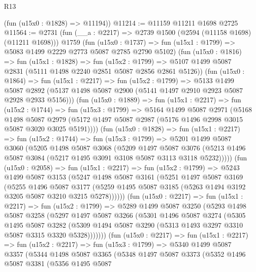 \begin{lexlean}{R13}
\begin{coremodule}
      (fun (u15x0 : @1828) => @11194))
@11214 := @11159 @11211 @1698 @2725
@11564 := @2731
    (fun (__a : @2217) => @2739 @1500 (@2594 (@11158 @1698) (@11211 @1698)))
    @1759
    (fun (u15x0 : @1737) => fun (u15x1 : @1799) => @5083 @1499 @2229 @2773 @5087 @2785 @2790 @5102)
    (fun (u15x0 : @1816) =>
    fun (u15x1 : @1828) =>
    fun (u15x2 : @1799) =>
    @5107 @1499 @5087 @2831 (@5111 @1498 @2240 @2851 @5087 @2856 @2861 @5126))
    (fun (u15x0 : @1864) =>
    fun (u15x1 : @2217) =>
    fun (u15x2 : @1799) =>
    @5133
      @1499
      @5087
      @2892
      (@5137 @1498 @5087 @2900 (@5141 @1497 @2910 @2923 @5087 @2928 @2933 @5156)))
    (fun (u15x0 : @1889) =>
    fun (u15x1 : @2217) =>
    fun (u15x2 : @1744) =>
    fun (u15x3 : @1799) =>
    @5164
      @1499
      @5087
      @2971
      (@5168
        @1498
        @5087
        @2979
        (@5172 @1497 @5087 @2987 (@5176 @1496 @2998 @3015 @5087 @3020 @3025 @5191))))
    (fun (u15x0 : @1828) =>
    fun (u15x1 : @2217) =>
    fun (u15x2 : @1744) =>
    fun (u15x3 : @1799) =>
    @5201
      @1499
      @5087
      @3060
      (@5205
        @1498
        @5087
        @3068
        (@5209
          @1497
          @5087
          @3076
          (@5213 @1496 @5087 @3084 (@5217 @1495 @3091 @3108 @5087 @3113 @3118 @5232)))))
    (fun (u15x0 : @2058) =>
    fun (u15x1 : @2217) =>
    fun (u15x2 : @1799) =>
    @5243
      @1499
      @5087
      @3153
      (@5247
        @1498
        @5087
        @3161
        (@5251
          @1497
          @5087
          @3169
          (@5255
            @1496
            @5087
            @3177
            (@5259 @1495 @5087 @3185 (@5263 @1494 @3192 @3205 @5087 @3210 @3215 @5278))))))
    (fun (u15x0 : @2217) =>
    fun (u15x1 : @2217) =>
    fun (u15x2 : @1799) =>
    @5289
      @1499
      @5087
      @3250
      (@5293
        @1498
        @5087
        @3258
        (@5297
          @1497
          @5087
          @3266
          (@5301
            @1496
            @5087
            @3274
            (@5305
              @1495
              @5087
              @3282
              (@5309 @1494 @5087 @3290 (@5313 @1493 @3297 @3310 @5087 @3315 @3320 @5328)))))))
    (fun (u15x0 : @2217) =>
    fun (u15x1 : @2217) =>
    fun (u15x2 : @2217) =>
    fun (u15x3 : @1799) =>
    @5340
      @1499
      @5087
      @3357
      (@5344
        @1498
        @5087
        @3365
        (@5348
          @1497
          @5087
          @3373
          (@5352
            @1496
            @5087
            @3381
            (@5356
              @1495
              @5087

\end{coremodule}
\end{lexlean}
